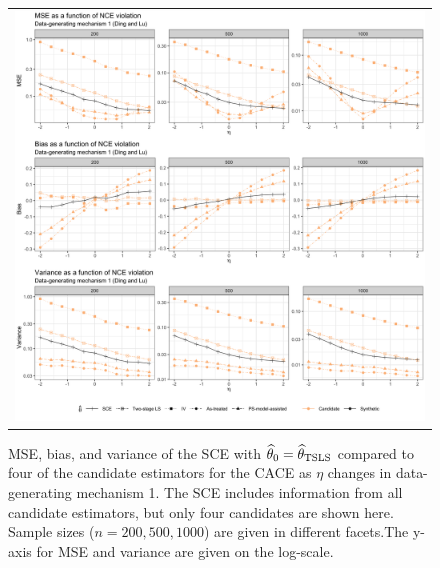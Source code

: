 \documentclass{article}
\def\stsls{_{\text{TSLS}}}
\begin{document}
\begin{figure}
\centering
\begin{tabular}{c}
\includegraphics[width =\textwidth]{figures/secondary-sim-mse-plot.png}
\end{tabular}\vspace{0.2in}
\caption{MSE, bias, and variance of the SCE with $\thetahat_0 = \thetahat\stsls$ compared to four of the candidate estimators for the CACE as $\eta$ changes in data-generating mechanism 1. The SCE includes information from all candidate estimators, but only four candidates are shown here. Sample sizes ($n = 200, 500, 1000$) are given in different facets.The y-axis for MSE and variance are given on the log-scale.}\label{sec-sim-pl}
\end{figure}
\end{document}
